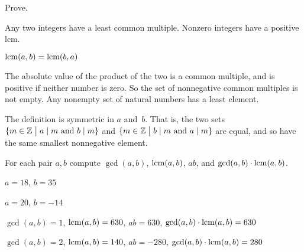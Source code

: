 \documentclass{ibl}
\begin{document}
\begin{ex} Prove.
\begin{exes}
\item {} Any two integers have a least common multiple.
  Nonzero integers have a positive lcm.
\item {} $\operatorname{lcm}(a,b)=\operatorname{lcm}(b,a)$
\end{exes}
\begin{ans}
\begin{exes}
\item The absolute value of the product of the two is a common multiple,
  and is positive if neither number is zero.
  So the set of nonnegative common multiples is not empty.
  Any nonempty set of natural numbers has a least element.
\item The definition is symmetric in $a$ and~$b$.
  That is, the two sets
  $\{m\in\mathbb{Z} \bigm| \text{$a\mid m$ and $b\mid m$}\}$
  and     
  $\{m\in\mathbb{Z} \bigm| \text{$b\mid m$ and $a\mid m$}\}$
  are equal, and so have the same smallest nonnegative element.
\end{exes}
\end{ans}
\end{ex}

\begin{ex}
For each pair $a,b$ compute $\gcd(a,b)$, $\operatorname{lcm}(a,b)$, $ab$, and
$\gcd(a,b)\cdot\operatorname{lcm}(a,b)$.
\begin{exes}
\item $a=18$, $b=35$  
\item $a=20$, $b=-14$
\end{exes}
\begin{ans}
\begin{exes}
\item $\gcd(a,b)=1$, $\operatorname{lcm}(a,b)=630$, $ab=630$, $\gcd(a,b)\cdot\operatorname{lcm}(a,b)=630$
\item $\gcd(a,b)=2$, $\operatorname{lcm}(a,b)=140$, $ab=-280$, $\gcd(a,b)\cdot\operatorname{lcm}(a,b)=280$
\end{exes}
\end{ans}
\end{ex}
\end{document}
